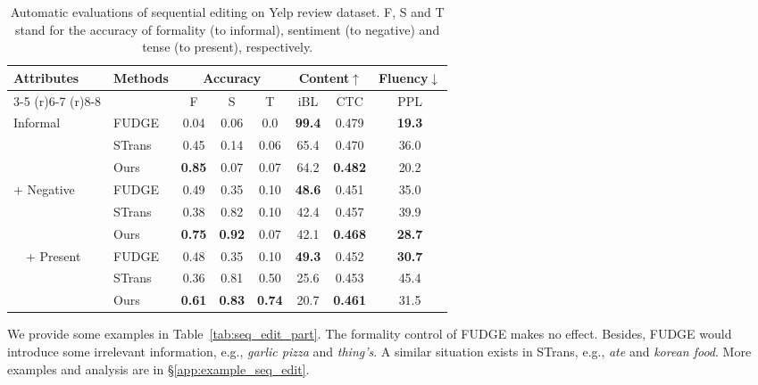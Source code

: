 \documentclass[11pt]{article}
\begin{document}
\begin{table}[t]
    \centering
    \scriptsize
    \vspace{-20pt}
    \setlength\tabcolsep{4.5pt}
    \begin{tabular}{llcccccc}
    \toprule
    \multirow{3}{*}{Attributes}&\multirow{3}{*}{Methods}&\multicolumn{3}{c}{Accuracy}&\multicolumn{2}{c}{Content$\uparrow$}&Fluency$\downarrow$\\ \cmidrule(r){3-5}  \cmidrule(r){6-7}  \cmidrule(r){8-8} 
     &    & F & S & T & iBL & CTC  &PPL\\\midrule
        \multirow{3}{*}{Informal}& FUDGE & 0.04& 0.06& 0.0 &\textbf{99.4}&0.479&\textbf{19.3}  \\
        & STrans & 0.45      & 0.14      & {0.06}  & {65.4}  & 0.470& 36.0 \\
    & Ours   & \textbf{0.85}      & {0.07}      & 0.07  & 64.2  & \textbf{0.482}& {20.2} \\\midrule
    \multirow{3}{*}{+ Negative}&  FUDGE &   0.49    & 0.35     &  0.10 & \textbf{48.6} & 0.451 & {35.0} \\
    &STrans & 0.38      & 0.82      & 0.10   & {42.4} & 0.457 & 39.9 \\
    & Ours   & \textbf{0.75}      & \textbf{0.92}      & {0.07}  & 42.1 & \textbf{0.468}& \textbf{28.7}  \\\midrule
    \multirow{3}{*}{\ \ + Present} & FUDGE &  0.48    & 0.35      &  0.10 & \textbf{49.3} & {0.452}& \textbf{30.7}  \\
    & STrans & 0.36      & 0.81      & 0.50   & {25.6}  & 0.453& 45.4 \\
    & Ours   & \textbf{0.61}      & \textbf{0.83}      & \textbf{0.74}  & 20.7 & \textbf{0.461}&{31.5}\\\bottomrule
    \end{tabular}
\caption{Automatic evaluations of sequential editing on Yelp review dataset. F, S and T stand for the accuracy of formality (to informal), sentiment (to negative) and tense (to present), respectively.
    }
    \label{tab:seq_edit_auto}
    \vspace{-10pt}
\end{table}
We provide some examples in Table~\ref{tab:seq_edit_part}. The formality control of FUDGE makes no effect. Besides, FUDGE would introduce some irrelevant information, e.g., \textit{garlic pizza} and \textit{thing's}. A similar situation exists in STrans, e.g., \textit{ate} and \textit{korean food}.  
More examples and analysis are in \S\ref{app:example_seq_edit}.
\end{document}
